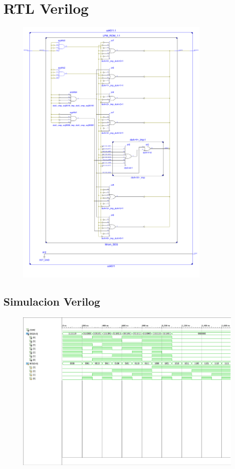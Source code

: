     \section{RTL Verilog}\label{annex:rtl}
      \begin{figure}[!ht]
      \centering
        \includegraphics[width=0.85\textwidth]{annex/rtl_view.pdf}
      \end{figure}
  \begin{landscape}
    \pagestyle{empty}
    \section{Simulacion Verilog}\label{annex:sim}
      \begin{figure}[!ht]
      \centering
        \includegraphics[height=.9\textwidth]{annex/verilog-sim.pdf}
      \end{figure}
  \end{landscape}
